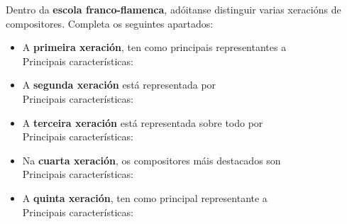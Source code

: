 \begin{ejercicio}
Dentro da \textbf{escola franco-flamenca}, adóitanse distinguir varias xeracións de compositores. Completa os seguintes apartados:
\begin{multicols}{2}

\begin{itemize}
    \item A \textbf{primeira xeración}, ten como principais representantes a \dotfill \\
    Principais características: 
    \par
    \vspace*{2.5cm}
    \item  A \textbf{segunda xeración} está representada por \dotfill \\
    Principais características: 
    \par
    \vspace*{2.5cm}
    \item A \textbf{terceira xeración} está representada sobre todo por \dotfill \\ 
    Principais características:
    \par
    \vspace*{2.5cm}
    \item  Na \textbf{cuarta xeración}, os compositores máis destacados son \dotfill \\
    Principais características:
    \par
    \vspace*{2.5cm}
    \item  A \textbf{quinta xeración}, ten como principal representante a \dotfill \\
    Principais características:
    \par
    \vspace*{2cm}    
\end{itemize}
\end{multicols}
\end{ejercicio}